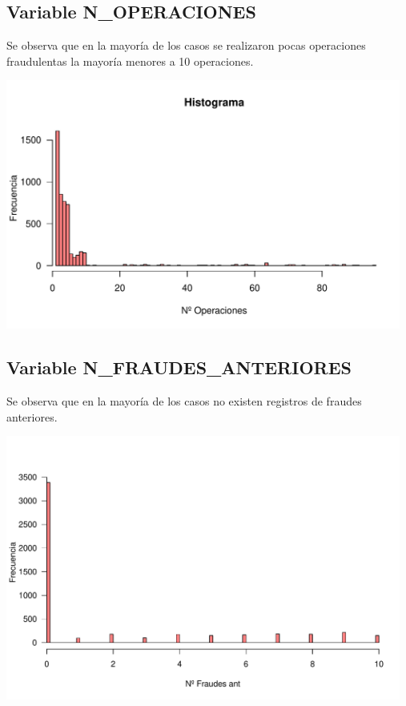 \documentclass[
	11pt, %
	spanish, %
]{fphw}
\begin{document}
\newpage
\subsection*{Variable N\_OPERACIONES}
Se observa que en la mayoría de los casos se realizaron pocas operaciones fraudulentas la mayoría menores a 10 operaciones.
\begin{center}
	\includegraphics[width=13cm]{n_operaciones.pdf}
\end{center}



\subsection*{Variable N\_FRAUDES\_ANTERIORES}
Se observa que en la mayoría de los casos no existen registros de fraudes anteriores.
\begin{center}
	\includegraphics[width=13cm]{n_fraudes.pdf}
\end{center}
\end{document}
